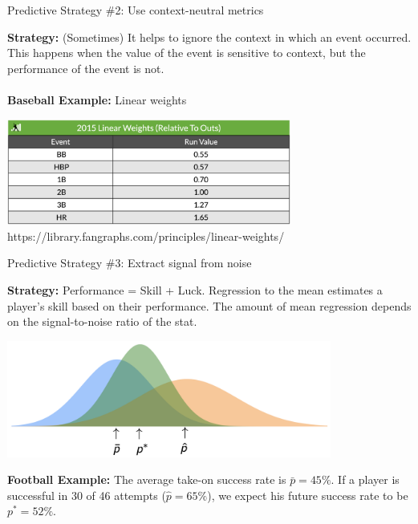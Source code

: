 \documentclass[handout]{beamer}
\begin{document}
\begin{frame}{Predictive Strategy \#2: Use context-neutral metrics}

  {\bf Strategy:} (Sometimes) It helps to ignore the context in which an event occurred. This happens when the value of the event is sensitive to context, but the performance of the event is not.\\
  ~\\
  {\bf Baseball Example:} Linear weights
  \begin{center}
    \includegraphics[width = 0.7\textwidth]{images/linear_weights.png}\\
    {\scriptsize \color{gray} https://library.fangraphs.com/principles/linear-weights/}
  \end{center}
\end{frame}


\begin{frame}{Predictive Strategy \#3: Extract signal from noise}

  {\bf Strategy:} Performance = Skill + Luck. Regression to the mean estimates a player's skill based on their performance. The amount of mean regression depends on the signal-to-noise ratio of the stat.
  \begin{center}
    \includegraphics[width = 0.8\textwidth]{images/rttm.png}
  \end{center}
  {\bf Football Example:} The average take-on success rate is $\bar p = 45\%$. If a player is successful in 30 of 46 attempts ($\hat p = 65\%$), we expect his future success rate to be $p^* = 52\%$.
\end{frame}
\end{document}
